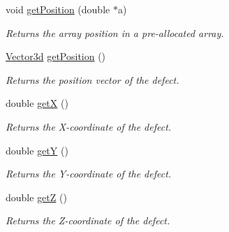 \begin{DoxyCompactItemize}
void \hyperlink{classDefect_aace5c752b85c368631746abc3d5bd714}{get\-Position} (double $\ast$a)
\begin{DoxyCompactList}\small\item\em Returns the array position in a pre-\/allocated array. \end{DoxyCompactList}\item 
\hyperlink{classVector3d}{Vector3d} \hyperlink{classDefect_a270caed3561fa5fa284af6427b6ca2e4}{get\-Position} ()
\begin{DoxyCompactList}\small\item\em Returns the position vector of the defect. \end{DoxyCompactList}\item 
double \hyperlink{classDefect_a01b96c453c13db82b5835682e1849dc0}{get\-X} ()
\begin{DoxyCompactList}\small\item\em Returns the X-\/coordinate of the defect. \end{DoxyCompactList}\item 
double \hyperlink{classDefect_a9ea8df3b4c621762a327813056e63911}{get\-Y} ()
\begin{DoxyCompactList}\small\item\em Returns the Y-\/coordinate of the defect. \end{DoxyCompactList}\item 
double \hyperlink{classDefect_a6f59edeca7ca8bfa01c54fd6b1a62374}{get\-Z} ()
\begin{DoxyCompactList}\small\item\em Returns the Z-\/coordinate of the defect. \end{DoxyCompactList}\end{DoxyCompactItemize}
